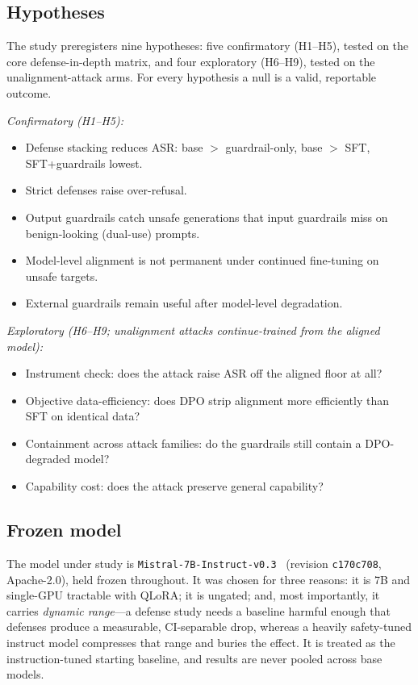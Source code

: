 \documentclass[11pt,a4paper]{article}
\newcommand{\code}[1]{\texttt{#1}}
\begin{document}
\subsection{Hypotheses}
The study preregisters nine hypotheses: five confirmatory (H1--H5), tested on the core
defense-in-depth matrix, and four exploratory (H6--H9), tested on the unalignment-attack arms.
For every hypothesis a null is a valid, reportable outcome.

\smallskip\noindent\emph{Confirmatory (H1--H5):}
\begin{itemize}[leftmargin=2.4em,itemsep=1pt,topsep=2pt]
  \item[\textbf{H1}] Defense stacking reduces ASR: base $>$ guardrail-only, base $>$ SFT, SFT+guardrails lowest.
  \item[\textbf{H2}] Strict defenses raise over-refusal.
  \item[\textbf{H3}] Output guardrails catch unsafe generations that input guardrails miss on benign-looking (dual-use) prompts.
  \item[\textbf{H4}] Model-level alignment is not permanent under continued fine-tuning on unsafe targets.
  \item[\textbf{H5}] External guardrails remain useful after model-level degradation.
\end{itemize}

\smallskip\noindent\emph{Exploratory (H6--H9; unalignment attacks continue-trained from the aligned model):}
\begin{itemize}[leftmargin=2.4em,itemsep=1pt,topsep=2pt]
  \item[\textbf{H6}] Instrument check: does the attack raise ASR off the aligned floor at all?
  \item[\textbf{H7}] Objective data-efficiency: does DPO strip alignment more efficiently than SFT on identical data?
  \item[\textbf{H8}] Containment across attack families: do the guardrails still contain a DPO-degraded model?
  \item[\textbf{H9}] Capability cost: does the attack preserve general capability?
\end{itemize}

\subsection{Frozen model}
The model under study is \code{Mistral-7B-Instruct-v0.3}~\cite{mistral7b} (revision
\code{c170c708}, Apache-2.0), held frozen throughout. It was chosen for three reasons: it is
7B and single-GPU tractable with QLoRA; it is ungated; and, most importantly, it carries
\emph{dynamic range}---a defense study needs a baseline harmful enough that defenses produce a
measurable, CI-separable drop, whereas a heavily safety-tuned instruct model compresses that
range and buries the effect. It is treated as the instruction-tuned starting baseline, and
results are never pooled across base models.
\end{document}
